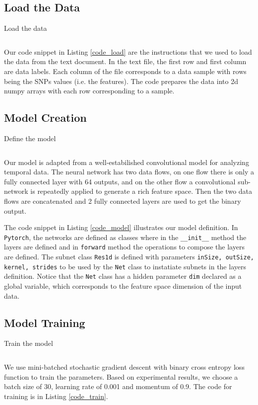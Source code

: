 \documentclass[a4paper,12pt]{article}
\newcommand{\torch}{\texttt{Pytorch}}
\begin{document}
\subsection{Load the Data}
\begin{listing}[H]
	\caption{Load the data}
	\inputminted[frame=single,framesep=10pt,linenos]{python3}{load_data.py}
	\label{code_load}
\end{listing}
Our code snippet in Listing \ref{code_load} are the instructions that we used to load the data from the text document. In the text file, the first row and first column are data labels. Each column of the file corresponds to a data sample with rows being the SNPs values (i.e. the features). The code prepares the data into 2d numpy arrays with each row corresponding to a sample.

\subsection{Model Creation}
\begin{listing}[H]
	\caption{Define the model}
	\inputminted[frame=single,framesep=10pt,linenos]{python3}{torch_model.py}
	\label{code_model}
\end{listing}
Our model is adapted from a well-estabilished convolutional model for analyzing temporal data. The neural network has two data flows, on one flow there is only a fully connected layer with 64 outputs, and on the other flow a convolutional sub-network is repeatedly applied to generate a rich feature space. Then the two data flows are concatenated and 2 fully connected layers are used to get the binary output.

The code snippet in Listing \ref{code_model} illustrates our model definition. In \torch, the networks are defined as classes where in the \texttt{\_\_init\_\_} method the layers are defined and in \texttt{forward} method the operations to compose the layers are defined. The subnet class \texttt{Res1d} is defined with parameters \texttt{inSize, outSize, kernel, strides} to be used by the \texttt{Net} class to instatiate subnets in the layers definition. Notice that the \texttt{Net} class has a hidden parameter \texttt{dim} declared as a global variable, which corresponds to the feature space dimension of the input data.

\subsection{Model Training}
\begin{listing}[H]
	\caption{Train the model}
	\inputminted[frame=single,framesep=10pt,linenos]{python3}{train.py}
	\label{code_train}
\end{listing}
We use mini-batched stochastic gradient descent with binary cross entropy loss function to train the parameters. Based on experimental results, we choose a batch size of 30, learning rate of 0.001 and momentum of 0.9. The code for training is in Listing \ref{code_train}.
\end{document}
